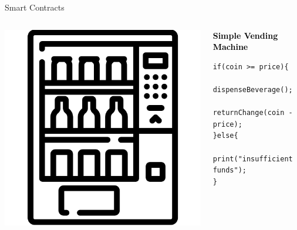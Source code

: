 \documentclass[]{beamer}
\begin{document}

\begin{frame}[fragile]{Smart Contracts}
	\begin{columns}
		\begin{column}{0.3\textwidth}
			\includegraphics[width=1\textwidth]{../assets/images/vending-machine.png}
		\end{column}
		\begin{column}{0.6\textwidth}
			\begin{block}{\textcolor{black}{\textbf{Simple Vending Machine}}}
				\begin{lstlisting}[firstnumber=1,  xleftmargin=0pt, columns=fullflexible,language=Solidity] 
if(coin >= price){
	dispenseBeverage();
	returnChange(coin - price);
}else{
	print("insufficient funds");
}
				\end{lstlisting}
			\end{block}
		\end{column}
	\end{columns}
	\vspace{0.5cm}
\end{frame}
\end{document}
